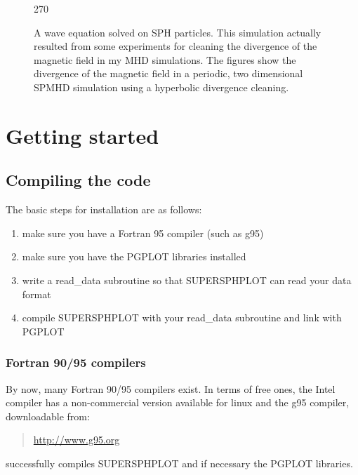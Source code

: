 \documentclass[a4paper,12pt]{article}
\begin{document}
\begin{figure}
\begin{center}
\begin{turn}{270}\end{turn}
\caption{A wave equation solved on SPH particles. This simulation actually resulted from some experiments for cleaning the divergence of the magnetic field in my MHD simulations. The figures show the divergence of the magnetic field in a periodic, two dimensional SPMHD simulation using a hyperbolic divergence cleaning.}
\label{fig:hyperbolic}
\end{center}
\end{figure}

\section{Getting started}
\subsection{Compiling the code}
The basic steps for installation are as follows:
\begin{enumerate}
\item make sure you have a Fortran 95 compiler (such as g95)
\item make sure you have the PGPLOT libraries installed
\item write a read\_data subroutine so that SUPERSPHPLOT can read your data format
\item compile SUPERSPHPLOT with your read\_data subroutine and link with PGPLOT
\end{enumerate}

\subsubsection{Fortran 90/95 compilers}
 By now, many Fortran 90/95 compilers exist. In terms of free ones, the Intel compiler has a
 non-commercial version available for linux and the
g95 compiler, downloadable from:
\begin{quote}
\url{http://www.g95.org}
\end{quote}
successfully compiles SUPERSPHPLOT and if necessary the PGPLOT libraries.
\end{document}
